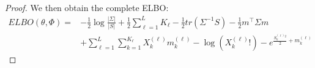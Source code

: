 \begin{proof}
    We then obtain the complete ELBO:
    $$
    \begin{align}
        ELBO(\theta, \Phi) = &-\frac12 \log \frac{|\Sigma|}{|S|} + \frac12 \sum_{\ell=1}^L K_{\ell} - \frac12 tr(\Sigma^{-1} S) - \frac12 m^{\top} \Sigma m \\
                            &+ \sum_{\ell=1}^L \sum_{k=1}^{K_{\ell}} X_k^{(\ell)} m_k^{(\ell)} - \log (X_k^{(\ell)}!) - e^{\frac{S_k^{(\ell)}^2}{2} + m_k^{(\ell)}}
    \end{align}
    $$
\end{proof}